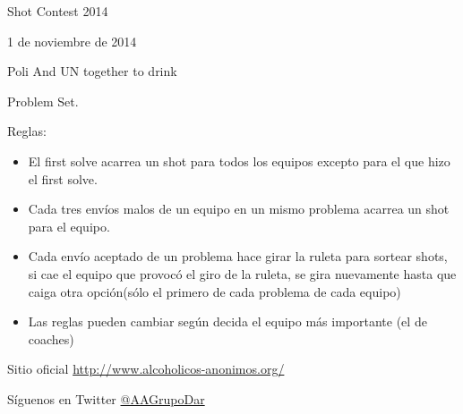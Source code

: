 \documentclass[12pt,fleqn]{article}
\begin{document}
 

  \setcounter{page}{0}

  \begin{center}
    {\huge \vspace{1.5in} Shot Contest 2014\\ 
      \vspace{0.2in}}
    \par
  \end{center}

  \vspace{0.3in}

  \begin{center}
    {\Large 
      1 de noviembre de 2014
    }
    \par
  \end{center}

  \begin{center}
    {\huge \vspace{1in} Poli And UN together to drink}
    \par
  \end{center}

  \begin{center}
    Problem Set.
 
    \par 

  \end{center} 

  \customtoc
  \vfill{}
  
	\newpage
	
	Reglas:
	
\begin{itemize}	
  \item El first solve acarrea un shot para todos los equipos excepto para el que hizo el first solve.
  \item Cada tres envíos malos de un equipo en un mismo problema acarrea un shot para el equipo.
  \item Cada envío aceptado de un problema hace girar la ruleta para sortear shots, si cae el equipo que provocó el giro de la ruleta, se gira nuevamente hasta que caiga otra opción(sólo el primero de cada problema de cada equipo)
  \item Las reglas pueden cambiar según decida el equipo más importante (el de coaches)
\end{itemize}
	
	
	
	
	\begin{center}
    Sitio oficial \url{http://www.alcoholicos-anonimos.org/}
			
		Síguenos en Twitter \href{https://twitter.com/AAGrupoDar}{\url{@AAGrupoDar}}
  \end{center}
	
\end{document}
